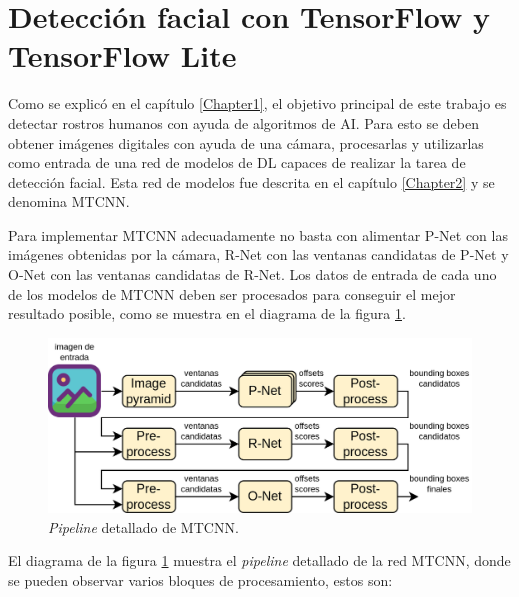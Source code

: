 \section{Detección facial con TensorFlow y TensorFlow Lite}
\label{section3_1}
Como se explicó en el capítulo \ref{Chapter1}, el objetivo principal de este trabajo es detectar rostros humanos con ayuda de algoritmos de AI. Para esto se deben obtener imágenes digitales con ayuda de una cámara, procesarlas y utilizarlas como entrada de una red de modelos de DL capaces de realizar la tarea de detección facial. Esta red de modelos fue descrita en el capítulo \ref{Chapter2} y se denomina MTCNN.

Para implementar MTCNN adecuadamente no basta con alimentar P-Net con las imágenes obtenidas por la cámara, R-Net con las ventanas candidatas de P-Net y O-Net con las ventanas candidatas de R-Net. Los datos de entrada de cada uno de los modelos de MTCNN deben ser procesados para conseguir el mejor resultado posible, como se muestra en el diagrama de la figura \ref{fig:mtcnn_npipe}.

\begin{figure}[h]
	\centering
	\includegraphics[scale=0.3]{./Figures/mtcnn_npipe.png}
	\caption{\textit{Pipeline} detallado de MTCNN.}
	\label{fig:mtcnn_npipe}
\end{figure}

El diagrama de la figura \ref{fig:mtcnn_npipe} muestra el \textit{pipeline} detallado de la red MTCNN, donde se pueden observar varios bloques de procesamiento, estos son:

